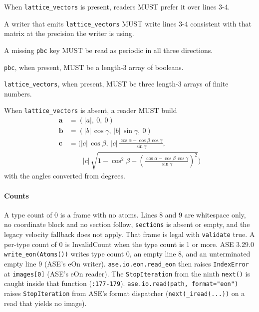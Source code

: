 \begin{description}
\tightlist
\item[CON-cell.1 (MUST)] When \texttt{lattice\_vectors} is present, readers MUST prefer
it over lines 3-4.
\item[CON-cell.2 (MUST)] A writer that emits \texttt{lattice\_vectors} MUST write lines
3-4 consistent with that matrix at the precision the writer is using.
\item[CON-cell.3 (MUST)] A missing \texttt{pbc} key MUST be read as periodic in all three
directions.
\item[CON-cell.4 (MUST)] \texttt{pbc}, when present, MUST be a length-3 array of
booleans.
\item[CON-cell.5 (MUST)] \texttt{lattice\_vectors}, when present, MUST be three length-3
arrays of finite numbers.
\item[CON-cell.6 (MUST)] When \texttt{lattice\_vectors} is absent, a reader MUST build
\begin{equation}\begin{aligned} \mathbf{a} &= \left(|a|,\ 0,\ 0\right) \\ \mathbf{b} &= \left(|b|\,\cos\gamma,\ |b|\,\sin\gamma,\ 0\right) \\ \mathbf{c} &= \biggl(|c|\,\cos\beta,\ |c|\,\frac{\cos\alpha - \cos\beta\,\cos\gamma}{\sin\gamma}, \\ &\qquad |c|\,\sqrt{1 - \cos^{2}\beta - \left(\frac{\cos\alpha - \cos\beta\,\cos\gamma}{\sin\gamma}\right)^{2}}\biggr) \end{aligned}\label{eq:spec-cell}\end{equation}
with the angles converted from degrees.
\end{description}

\paragraph{Counts}\label{spec:counts}

A type count of 0 is a frame with no atoms. Lines 8 and 9 are whitespace
only, no coordinate block and no section follow, \texttt{sections} is
absent or empty, and the legacy velocity fallback does not apply. That
frame is legal with \texttt{validate} true. A per-type count of 0 is
InvalidCount when the type count is 1 or more. ASE 3.29.0
\texttt{write\_eon(Atoms())} writes type count 0, an empty line 8, and
an unterminated empty line 9 (ASE's eOn writer).
\texttt{ase.io.eon.read\_\allowbreak{}eon} then raises \texttt{IndexError} at
\texttt{images{[}0{]}} (ASE's eOn reader). The
\texttt{StopIteration} from the ninth \texttt{next()} is caught inside
that function (\texttt{:177-179}).
\texttt{ase.io.read(path,\ format="eon")} raises \texttt{StopIteration}
from ASE's format dispatcher (\texttt{next(\_iread(...))} on a
read that yields no image).

